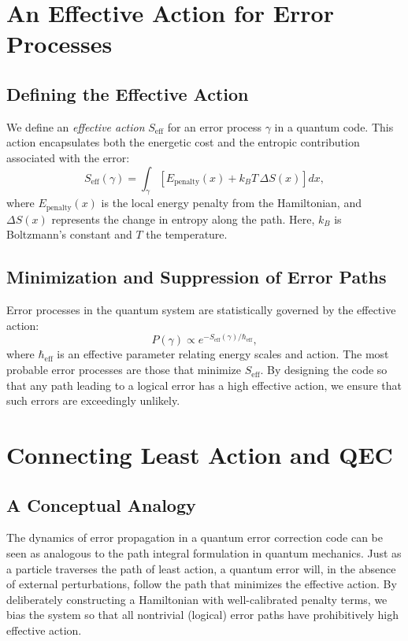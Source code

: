 \documentclass[12pt]{article}
\begin{document}
\section{An Effective Action for Error Processes}
\subsection{Defining the Effective Action}
We define an \emph{effective action} \( S_{\text{eff}} \) for an error process \( \gamma \) in a quantum code. This action encapsulates both the energetic cost and the entropic contribution associated with the error:
\begin{equation}
S_{\text{eff}}(\gamma) = \int_{\gamma} \left[ E_{\text{penalty}}(x) + k_B T\, \Delta S(x) \right] dx,
\end{equation}
where \( E_{\text{penalty}}(x) \) is the local energy penalty from the Hamiltonian, and \( \Delta S(x) \) represents the change in entropy along the path. Here, \( k_B \) is Boltzmann's constant and \( T \) the temperature.

\subsection{Minimization and Suppression of Error Paths}
Error processes in the quantum system are statistically governed by the effective action:
\begin{equation}
P(\gamma) \propto e^{-S_{\text{eff}}(\gamma)/\hbar_{\text{eff}}},
\end{equation}
where \( \hbar_{\text{eff}} \) is an effective parameter relating energy scales and action. The most probable error processes are those that minimize \( S_{\text{eff}} \). By designing the code so that any path leading to a logical error has a high effective action, we ensure that such errors are exceedingly unlikely.

\section{Connecting Least Action and QEC}
\subsection{A Conceptual Analogy}
The dynamics of error propagation in a quantum error correction code can be seen as analogous to the path integral formulation in quantum mechanics. Just as a particle traverses the path of least action, a quantum error will, in the absence of external perturbations, follow the path that minimizes the effective action. By deliberately constructing a Hamiltonian with well-calibrated penalty terms, we bias the system so that all nontrivial (logical) error paths have prohibitively high effective action.
\end{document}
